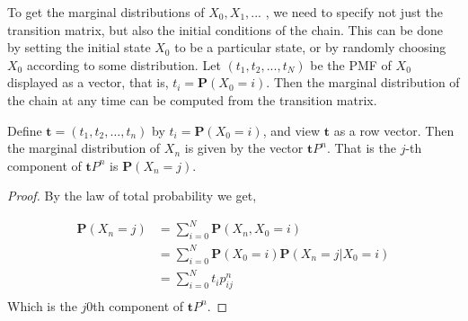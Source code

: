 To get the marginal distributions of $X_0, X_1,...$ , we need to specify not just the
transition matrix, but also the initial conditions of the chain. This can be done by
setting the initial state $X_{0}$ to be a particular state, or by randomly choosing $X_0$
according to some distribution. Let $(t_1, t_2,...,t_N)$ be the PMF of $X_{0}$ displayed as
a vector, that is, $t_i = \mathbf{P}(X_0 = i)$. Then the marginal distribution of the chain at any time can be computed from the transition matrix.

\begin{proposition}
    Define $ \mathbf{t} = (t_{1}, t_{2}, \ldots, t_{n})$ by $ t_{i}=\mathbf{P}(X_{0}=i) $, and view $ \mathbf{t} $ as a row vector.
    Then the marginal distribution of $ X_{n} $ is given by the vector $ \mathbf{t}P^{n} $. That is the $ j $-th component of  $ \mathbf{t}P^{n} $ 
    is $ \mathbf{P}(X_{n}=j) $.
\end{proposition}
\begin{proof}
    By the law of total probability we get,

    \begin{align*}
        \mathbf{P}(X_{n}=j) &= \sum_{i=0}^{N} \mathbf{P}(X_{n},X_{0}=i)\\
                            &= \sum_{i=0}^{N} \mathbf{P}(X_{0}=i)\mathbf{P}(X_{n}=j|X_{0}=i)  \\
                            &= \sum_{i=0}^{N} t_{i}p^{n}_{ij} \\
    \end{align*}
    Which is the $ j $0th component of  $ \mathbf{t}P^{n} $.
\end{proof}

